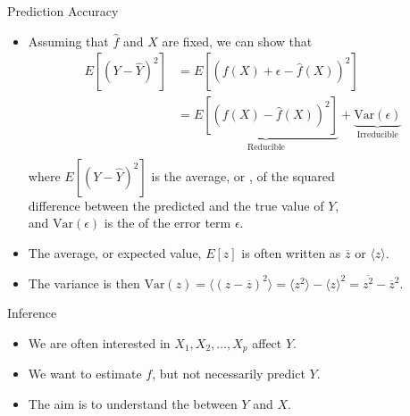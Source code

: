 \documentclass[mathserif, aspectratio=169]{beamer}
\begin{document}
\begin{frame}{Prediction Accuracy}
	\begin{itemize}
		\item Assuming that $\hat{f}$ and $X$ are fixed, we can show that
			\begin{align*}
				E[(Y - \hat{Y})^2] &= E[(f(X) + \epsilon - \hat{f}(X))^2]\\ 
				&= \underbrace{E[(f(X) - \hat{f}(X))^2]}_\text{Reducible}
				+ \underbrace{\text{Var}(\epsilon)}_\text{Irreducible} \\ 
			\end{align*}
			where $E[(Y - \hat{Y})^2]$ is the average, or , of the squared\\
			difference between the predicted and the true value of $Y$,\\
			and $\text{Var}(\epsilon)$ is the  of the error term $\epsilon$.
		\item The average, or expected value, $E[z]$ is often written as $\overline{z}$ or $\langle z \rangle$.
		\item The variance is then $\text{Var}(z) = \langle (z - \overline{z})^2 \rangle
			= \langle z^2 \rangle - {\langle z \rangle}^2 = \overline{z^2} - \overline{z}^2$.
	\end{itemize}
\end{frame}

\begin{frame}{Inference}
	\begin{itemize}
		\item We are often interested in  $X_1, X_2, \dots, X_p$ affect $Y$.
		\item We want to estimate $f$, but not necessarily predict $Y$.
		\item The aim is to understand the  between $Y$ and $X$.
	\end{itemize}
\end{frame}
\end{document}
